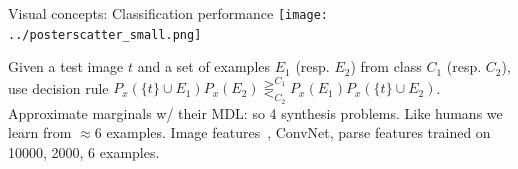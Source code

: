 \documentclass[final]{beamer}
\newlength{\onecolwid}
\newlength{\twocolwid}
\begin{document}
\begin{frame}[t]
\begin{columns}[t]
\begin{column}{\twocolwid}
\begin{columns}[t,totalwidth=\twocolwid]
\begin{column}{\onecolwid}
\begin{block}{Visual concepts: Classification performance}
\hspace{2cm}\texttt{[image: ../posterscatter\_small.png]}

Given a test image $t$ and a set of examples $E_1$ (resp. $E_2$) from class $C_1$ (resp. $C_2$),
use  decision rule 
$P_x(\{t\}\cup E_1)P_x(E_2)\mathop{\gtreqless}_{C_2}^{C_1} P_x(E_1)P_x(\{t\}\cup E_2)$.
Approximate marginals w/ their MDL: so 4 synthesis problems.
Like humans we learn from $\approx 6$ examples. Image features~\cite{fleuret2011comparing}, ConvNet, parse features trained on 10000, 2000,  6 examples.


      \end{block}

\end{column} %

\end{columns} %



\begin{columns}[t,totalwidth=\twocolwid] %

\begin{column}{\onecolwid} %






\end{column}
\end{columns}
\end{column}
\end{columns}
\end{frame}
\end{document}
